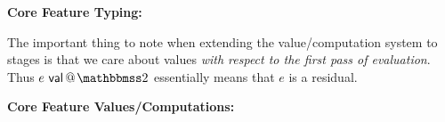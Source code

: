 \documentclass[]{article}
\newcommand {\next}{asdlfkj}
\begin{document}
\begin{abstrsyn}
\begin{framed}
\noindent\textbf{Core Feature Typing:}
\end{framed}

The important thing to note when extending the value/computation system to stages is that
we care about values \emph{with respect to the first pass of evaluation}.
Thus $e \valt$ essentially means that $e$ is a residual.

\begin{framed}
\noindent\textbf{Core Feature Values/Computations:}
\end{framed}


\end{abstrsyn}
\end{document}
